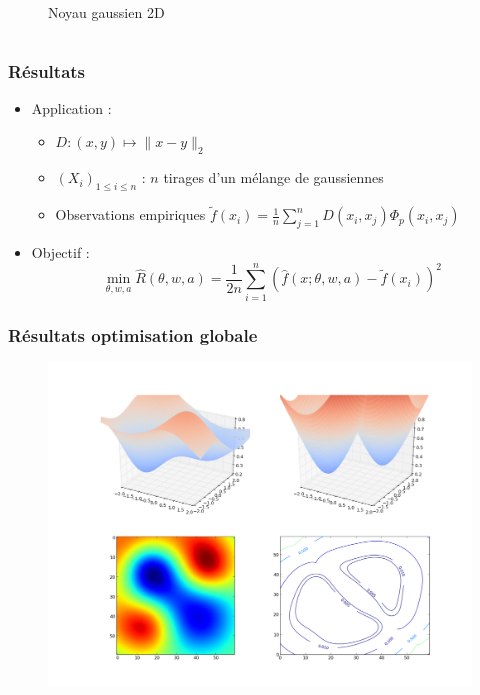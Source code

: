 \documentclass[c]{beamer}
\begin{document}
\begin{frame}
\begin{columns}
\begin{column}{.5\textwidth}
\begin{figure}
              \caption{Noyau gaussien 2D}
          \end{figure}
      \end{column}
  \end{columns}

\end{frame}

\begin{frame}
    \frametitle{Résultats}

    \begin{itemize}
        \item Application :
            \begin{itemize}
                \item $D : (x, y) \mapsto \|x - y\|_2$
                \item $(X_i)_{1 \leq i \leq n}$ : $n$ tirages d'un mélange de gaussiennes
                \item Observations empiriques $\tilde{f}(x_i) = \frac{1}{n} \sum_{j=1}^n D(x_i, x_j) \Phi_p(x_i, x_j)$
            \end{itemize}
        \item Objectif :
            \[
                \min_{\theta, w, a} \hat{R}(\theta, w, a)
                = \frac{1}{2n} \sum_{i= 1}^n \left( \hat{f}(x; \theta, w, a) - \tilde{f}(x_i) \right)^2
            \]
    \end{itemize}
\end{frame}

\begin{frame}
    \frametitle{Résultats optimisation globale}

    \begin{figure}
        \centering
        \includegraphics[width=.8\textwidth]{kernel_estimation_global}
    \end{figure}
\end{frame}
\end{document}
